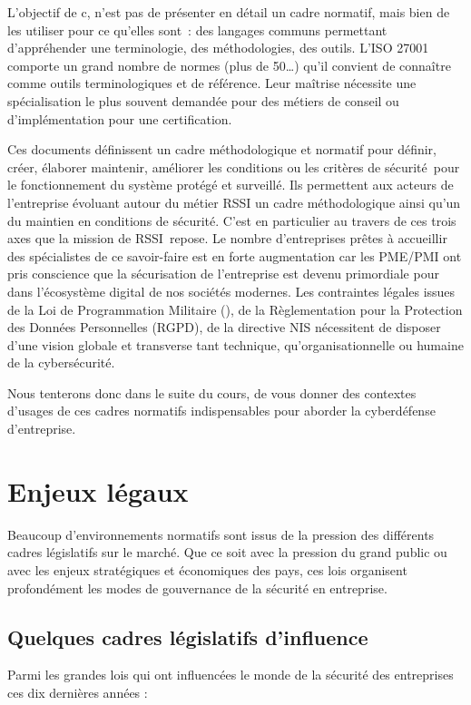 \begin{nota}
L’objectif de c\edoc, n’est pas de présenter en détail un cadre normatif, mais bien de les utiliser pour ce qu’elles sont : des langages communs permettant d’appréhender une terminologie, des méthodologies, des outils. L’ISO 27001 comporte un grand nombre de normes (plus de 50…) qu’il convient de connaître comme outils terminologiques et de référence. Leur maîtrise nécessite une spécialisation le plus souvent demandée pour des métiers de conseil ou d’implémentation pour une certification.
\end{nota}

Ces documents définissent un cadre méthodologique et normatif pour définir, créer, élaborer maintenir, améliorer les conditions ou les critères de sécurité pour le fonctionnement du système protégé et surveillé. 
Ils permettent aux acteurs de l'entreprise évoluant autour du métier RSSI un cadre méthodologique ainsi qu’un  du maintien en conditions de sécurité. C’est en particulier au travers de ces trois axes que la mission de RSSI repose. 
Le nombre d’entreprises prêtes à accueillir des spécialistes de ce savoir-faire est en forte augmentation car les PME/PMI ont pris conscience que la sécurisation de l’entreprise est devenu primordiale pour  dans l’écosystème digital de nos sociétés modernes. Les contraintes légales issues de la Loi de Programmation Militaire (), de la Règlementation pour la Protection des Données Personnelles (RGPD), de la directive NIS nécessitent de disposer d’une vision globale et transverse tant technique, qu'organisationnelle ou humaine de la cybersécurité.

Nous tenterons donc dans le suite du cours, de vous donner des contextes d'usages de ces cadres normatifs indispensables pour aborder la cyberdéfense d’entreprise. 

\section{Enjeux légaux}

Beaucoup d'environnements normatifs sont issus de la pression des différents cadres législatifs sur le marché. Que ce soit avec la pression du grand public ou avec les enjeux stratégiques et économiques des pays, ces lois organisent profondément les modes de gouvernance de la sécurité en entreprise.

\subsection{Quelques cadres législatifs d'influence}
Parmi les grandes lois qui ont influencées  le monde de la sécurité des entreprises ces dix dernières années :

